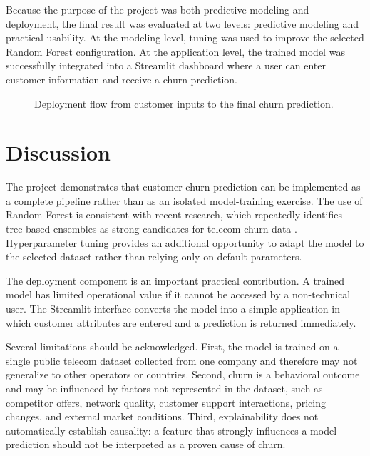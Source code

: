 \documentclass[conference]{IEEEtran}
\begin{document}
Because the purpose of the project was both predictive modeling and deployment, the final result was evaluated at two levels: predictive modeling and practical usability. At the modeling level, tuning was used to improve the selected Random Forest configuration. At the application level, the trained model was successfully integrated into a Streamlit dashboard where a user can enter customer information and receive a churn prediction.

\begin{figure}[H]
\centering
{}
\caption{Deployment flow from customer inputs to the final churn prediction.}
\end{figure}

\clearpage
\section{Discussion}
The project demonstrates that customer churn prediction can be implemented as a complete pipeline rather than as an isolated model-training exercise. The use of Random Forest is consistent with recent research, which repeatedly identifies tree-based ensembles as strong candidates for telecom churn data \cite{poudel2024,atay2025}. Hyperparameter tuning provides an additional opportunity to adapt the model to the selected dataset rather than relying only on default parameters.

The deployment component is an important practical contribution. A trained model has limited operational value if it cannot be accessed by a non-technical user. The Streamlit interface converts the model into a simple application in which customer attributes are entered and a prediction is returned immediately.

Several limitations should be acknowledged. First, the model is trained on a single public telecom dataset collected from one company and therefore may not generalize to other operators or countries. Second, churn is a behavioral outcome and may be influenced by factors not represented in the dataset, such as competitor offers, network quality, customer support interactions, pricing changes, and external market conditions. Third, explainability does not automatically establish causality: a feature that strongly influences a model prediction should not be interpreted as a proven cause of churn.
\end{document}
